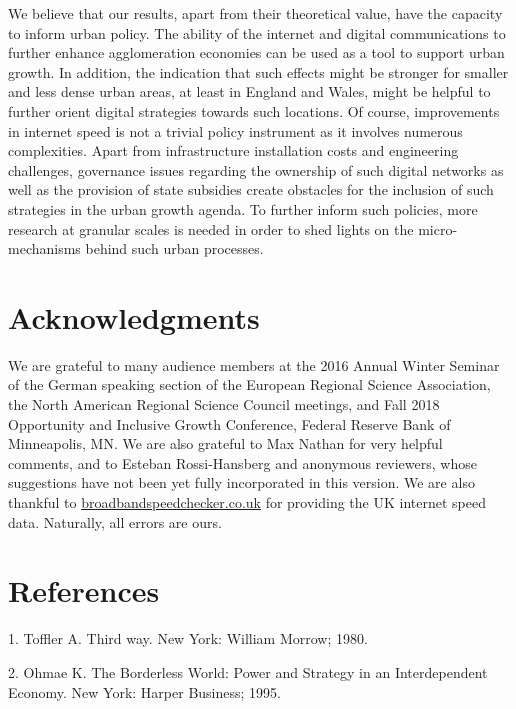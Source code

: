 \documentclass[10pt,letterpaper]{article}
\begin{document}
We believe that our results, apart from their theoretical value, have
the capacity to inform urban policy. The ability of the internet and
digital communications to further enhance agglomeration economies can be
used as a tool to support urban growth. In addition, the indication that
such effects might be stronger for smaller and less dense urban areas,
at least in England and Wales, might be helpful to further orient
digital strategies towards such locations. Of course, improvements in
internet speed is not a trivial policy instrument as it involves
numerous complexities. Apart from infrastructure installation costs and
engineering challenges, governance issues regarding the ownership of
such digital networks as well as the provision of state subsidies create
obstacles for the inclusion of such strategies in the urban growth
agenda. To further inform such policies, more research at granular
scales is needed in order to shed lights on the micro-mechanisms behind
such urban processes.

\hypertarget{acknowledgments}{%
\section*{Acknowledgments}\label{acknowledgments}}

We are grateful to many audience members at the 2016 Annual Winter
Seminar of the German speaking section of the European Regional Science
Association, the North American Regional Science Council meetings, and
Fall 2018 Opportunity and Inclusive Growth Conference, Federal Reserve
Bank of Minneapolis, MN. We are also grateful to Max Nathan for very
helpful comments, and to Esteban Rossi-Hansberg and anonymous reviewers,
whose suggestions have not been yet fully incorporated in this version.
We are also thankful to
\href{https://www.broadbandspeedchecker.co.uk/}{broadbandspeedchecker.co.uk}
for providing the UK internet speed data. Naturally, all errors are
ours.

\hypertarget{references}{%
\section*{References}\label{references}}

\hypertarget{refs}{}
\leavevmode\hypertarget{ref-toffler_third_1980}{}%
1. Toffler A. Third way. New York: William Morrow; 1980.

\leavevmode\hypertarget{ref-ohmae_borderless_1995}{}%
2. Ohmae K. The Borderless World: Power and Strategy in an
Interdependent Economy. New York: Harper Business; 1995.
\end{document}
